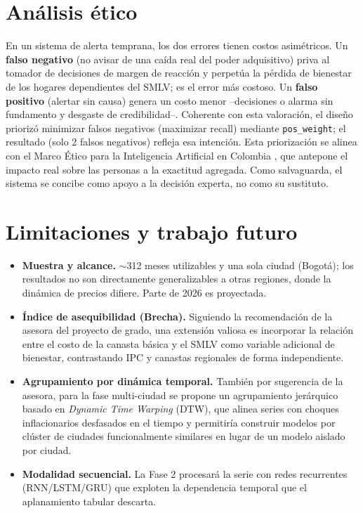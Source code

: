 \documentclass[11pt]{tg_usta}
\begin{document}
\section{Análisis ético}

En un sistema de alerta temprana, los dos errores tienen costos asimétricos. Un \textbf{falso negativo} (no avisar de una caída real del poder adquisitivo) priva al tomador de decisiones de margen de reacción y perpetúa la pérdida de bienestar de los hogares dependientes del SMLV; es el error más costoso. Un \textbf{falso positivo} (alertar sin causa) genera un costo menor --decisiones o alarma sin fundamento y desgaste de credibilidad--. Coherente con esta valoración, el diseño priorizó minimizar falsos negativos (maximizar recall) mediante \texttt{pos\_weight}; el resultado (solo 2 falsos negativos) refleja esa intención. Esta priorización se alinea con el Marco Ético para la Inteligencia Artificial en Colombia \cite{minciencias2021}, que antepone el impacto real sobre las personas a la exactitud agregada. Como salvaguarda, el sistema se concibe como apoyo a la decisión experta, no como su sustituto.

\section{Limitaciones y trabajo futuro}

\begin{itemize}
\item \textbf{Muestra y alcance.} $\sim$312 meses utilizables y una sola ciudad (Bogotá); los resultados no son directamente generalizables a otras regiones, donde la dinámica de precios difiere. Parte de 2026 es proyectada.
\item \textbf{Índice de asequibilidad (Brecha).} Siguiendo la recomendación de la asesora del proyecto de grado, una extensión valiosa es incorporar la relación entre el costo de la canasta básica y el SMLV como variable adicional de bienestar, contrastando IPC y canastas regionales de forma independiente.
\item \textbf{Agrupamiento por dinámica temporal.} También por sugerencia de la asesora, para la fase multi-ciudad se propone un agrupamiento jerárquico basado en \emph{Dynamic Time Warping} (DTW), que alinea series con choques inflacionarios desfasados en el tiempo y permitiría construir modelos por clúster de ciudades funcionalmente similares en lugar de un modelo aislado por ciudad.
\item \textbf{Modalidad secuencial.} La Fase 2 procesará la serie con redes recurrentes (RNN/LSTM/GRU) que exploten la dependencia temporal que el aplanamiento tabular descarta.
\end{itemize}
\end{document}
